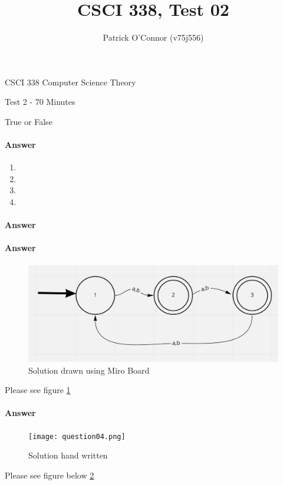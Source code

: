 \documentclass{article}
\title{CSCI 338, Test 02}
\author{Patrick O'Connor (v75j556)}
\begin{document}
\maketitle

CSCI 338 Computer Science Theory

Test 2 - 70 Minutes

{True or False}
\paragraph{Answer}
\begin{enumerate}
    \item 
    \item 
    \item 
    \item 
\end{enumerate}

\paragraph{Answer}


\paragraph{Answer}


\begin{figure}
    \includegraphics[width=\linewidth]{question03.png}
    \caption{Solution drawn using Miro Board}
    \label{fig:num03}
\end{figure}
Please see figure \ref{fig:num03}



\paragraph{Answer}
\begin{figure}
    \texttt{[image: question04.png]}
    \caption{Solution hand written}
    \label{fig:num04}
\end{figure}
Please see figure below \ref{fig:num04}
\end{document}
